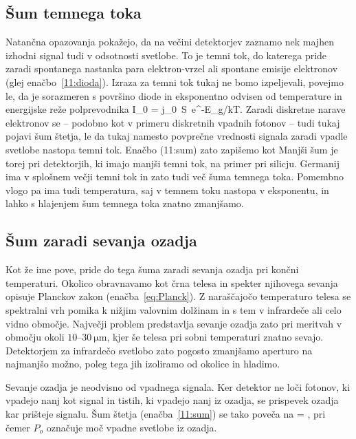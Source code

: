 \subsection*{Šum temnega toka} 
Natančna opazovanja pokažejo, da na večini detektorjev zaznamo nek majhen izhodni 
signal tudi v odsotnosti svetlobe. To je temni tok, do katerega pride zaradi
spontanega nastanka para elektron-vrzel ali spontane emisije elektronov 
(glej enačbo~\ref{11:dioda}). Izraza za temni tok tukaj ne bomo izpeljevali,
povejmo le, da je sorazmeren s površino diode in 
eksponentno odvisen od temperature in energijske reže polprevodnika 
\beq
I_0 = j_0\, S\, e^{-E_g/kT}.
\eeq
Zaradi diskretne narave elektronov se -- podobno
kot v primeru diskretnih vpadnih fotonov -- tudi tukaj pojavi šum štetja, le da tukaj 
namesto povprečne vrednosti signala zaradi vpadle svetlobe nastopa temni tok. 
Enačbo (11:sum) zato zapišemo kot 
Manjši šum je torej pri detektorjih, ki imajo manjši temni tok, na primer pri silicju. 
Germanij ima v splošnem večji temni tok in zato tudi več šuma temnega toka. Pomembno
vlogo pa ima tudi temperatura, saj v temnem toku nastopa v eksponentu, in lahko 
s hlajenjem šum temnega toka znatno zmanjšamo. 

\subsection*{Šum zaradi sevanja ozadja}
Kot že ime pove, pride do tega šuma zaradi sevanja ozadja pri končni temperaturi. 
Okolico obravnavamo kot črna telesa in spekter njihovega sevanja opisuje Planckov 
zakon (enačba~\ref{eq:Planck}). Z naraščajočo temperaturo telesa se 
spektralni vrh pomika k nižjim valovnim dolžinam in s tem v infrardeče ali celo 
vidno območje. Največji problem predstavlja sevanje ozadja zato pri meritvah v
območju okoli $10$--$30~\si{\micro\meter}$, kjer še telesa pri sobni temperaturi 
znatno sevajo. Detektorjem za infrardečo svetlobo zato pogosto zmanjšamo aperturo 
na najmanjšo možno, poleg tega jih izoliramo od okolice in hladimo. 

Sevanje ozadja je neodvisno od vpadnega signala. Ker detektor ne loči fotonov, ki 
vpadejo nanj kot signal in tistih, ki vpadejo nanj iz ozadja, se prispevek ozadja 
kar prišteje signalu. Šum štetja (enačba~\ref{11:sum}) se tako poveča na
\beq
{} = ,
\label{11:ozadje}
\eeq
pri čemer $P_o$ označuje moč vpadne svetlobe iz ozadja.

